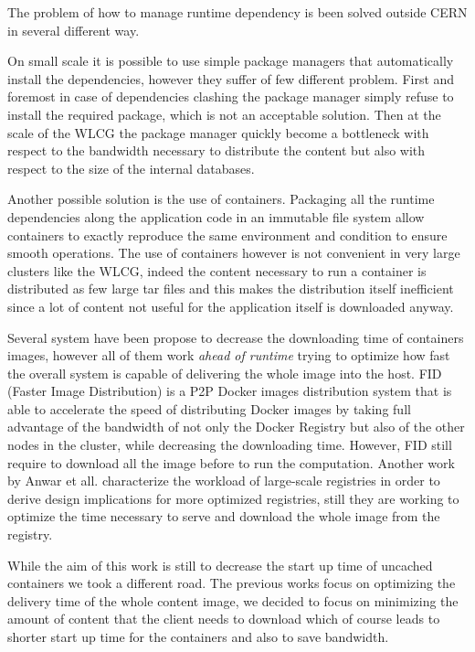 The problem of how to manage runtime dependency is been solved outside CERN in
several different way.

On small scale it is possible to use simple package managers that automatically
install the dependencies, however they suffer of few different problem. First
and foremost in case of dependencies clashing the package manager simply refuse
to install the required package, which is not an acceptable solution. Then at
the scale of the WLCG the package manager quickly become a bottleneck with
respect to the bandwidth necessary to distribute the content but also with
respect to the size of the internal databases.

Another possible solution is the use of containers. Packaging all the runtime
dependencies along the application code in an immutable file system allow
containers to exactly reproduce the same environment and condition to ensure
smooth operations. The use of containers however is not convenient in very
large clusters like the WLCG, indeed the content necessary to run a container
is distributed as few large tar files and this makes the distribution itself
inefficient since a lot of content not useful for the application itself is
downloaded anyway. 

Several system have been propose to decrease the downloading time of containers
images, however all of them work \textit{ahead of runtime} trying to optimize
how fast the overall system is capable of delivering the whole image into
the host. FID (Faster Image Distribution) \cite{FID} is a P2P Docker images
distribution system that is able to accelerate the speed of distributing Docker
images by taking full advantage of the bandwidth of not only the Docker
Registry but also of the other nodes in the cluster, while decreasing the
downloading time. However,  FID still require to download all the image before to run the
computation. Another work by Anwar et all. \cite{210500} characterize the
workload of large-scale registries in order to derive design implications for
more optimized registries, still they are working to optimize the time necessary
to serve and download the whole image from the registry.

While the aim of this work is still to decrease the start up time of uncached
containers we took a different road. The previous works focus on optimizing
the delivery time of the whole content image, we decided to focus on minimizing
the amount of content that the client needs to download which of course leads to
shorter start up time for the containers and also to save bandwidth.

